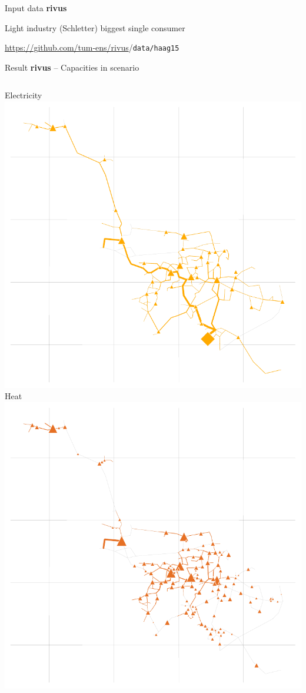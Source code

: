 \begin{frame}{Input data \textbf{rivus}}
    \begin{center}
        \raggedright\qquad
        Light industry (Schletter) biggest single consumer
    \end{center}

    {\tiny \url{https://github.com/tum-ens/rivus}/\texttt{data/haag15}}
\end{frame}

\begin{frame}{Result \textbf{rivus} -- Capacities in scenario }
    \begin{columns}
        \column{\squeezethree}
        	\centering
        	\textcolor{elec}{Electricity} \vphantom{gÖ}
        	\includegraphics[width=\squeezethree]{img/haag/scenario_no_electric_heating-caps-Elec}
        \column{\squeezethree}
        	\centering
        	\textcolor{heat}{Heat} \vphantom{gÖ}
        	\includegraphics[width=\squeezethree]{img/haag/scenario_no_electric_heating-caps-Heat}

\end{columns}
\end{frame}
